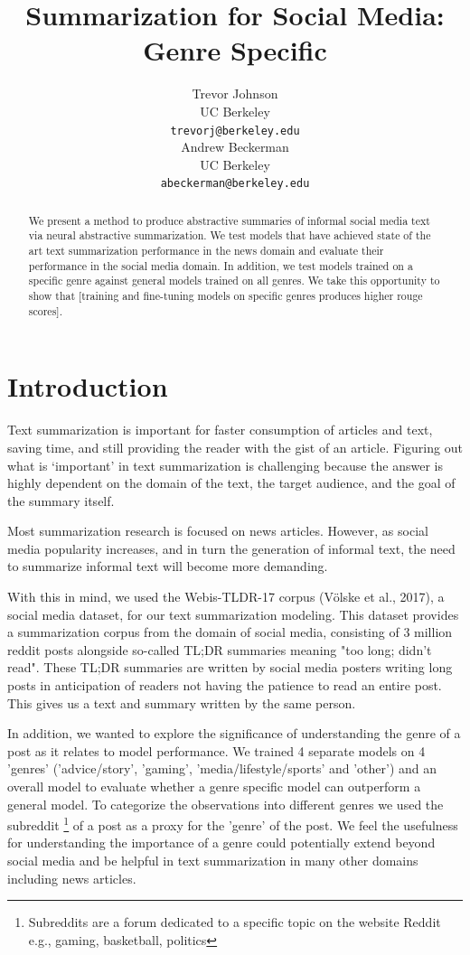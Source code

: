 \documentclass[11pt,a4paper, twocolumn]{article}
\title{Summarization for Social Media: Genre Specific}
\author{Trevor Johnson \\
  UC Berkeley  \\
  \texttt{trevorj@berkeley.edu} \\\And
  Andrew Beckerman \\
  UC Berkeley \\
  \texttt{abeckerman@berkeley.edu} \\}
\date{}
\begin{document}
\maketitle
\begin{abstract}

We present a method to produce abstractive summaries of informal social media text via neural abstractive summarization. We test models that have achieved state of the art text summarization performance in the news domain and evaluate their performance in the social media domain.
In addition, we test models trained on a specific genre against general models trained on all genres. We take this opportunity to show that [training and fine-tuning models on specific genres produces higher rouge scores].

\end{abstract}

\section{Introduction}

Text summarization is important for faster consumption of articles and text, saving time, and still providing the reader with the gist of an article. Figuring out what is ‘important’ in text summarization is challenging because the answer is highly dependent on the domain of the text, the target audience, and the goal of the summary itself.

Most summarization research is focused on news articles. However, as social media popularity increases, and in turn the generation of informal text, the need to summarize informal text will become more demanding.

With this in mind, we used the Webis-TLDR-17 corpus (Völske et al., 2017), a social media dataset, for our text summarization modeling. This dataset provides a summarization corpus from the domain of social media, consisting of 3 million reddit posts alongside so-called TL;DR summaries meaning "too long; didn't read".  These TL;DR summaries are written by social media posters writing long posts in anticipation of readers not having the patience to read an entire post. This gives us a text and summary written by the same person.

In addition, we wanted to explore the significance of understanding the genre of a post as it relates to model performance. We trained 4 separate models on 4 'genres' ('advice/story', 'gaming', 'media/lifestyle/sports' and 'other') and an overall model to evaluate whether a genre specific model can outperform a general model. To categorize the observations into different genres we used the subreddit \footnote{Subreddits are a forum dedicated to a specific topic on the website Reddit e.g., gaming, basketball, politics} of a post as a proxy for the 'genre' of the post. We feel the usefulness for understanding the importance of a genre could potentially extend beyond social media and be helpful in text summarization in many other domains including news articles.
\end{document}

